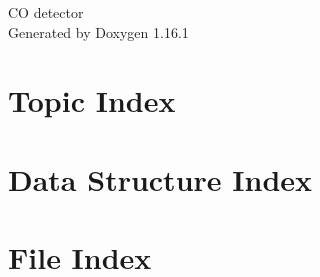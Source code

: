 \documentclass[twoside]{book}
\newcommand{\+}{\discretionary{\mbox{\scriptsize$\hookleftarrow$}}{}{}}
\newcommand{\clearemptydoublepage}{%
    \newpage{\pagestyle{empty}\cleardoublepage}%
  }
\begin{document}
  \raggedbottom
    \hypersetup{pageanchor=false,
                bookmarksnumbered=true,
                pdfencoding=unicode
               }
  \begin{titlepage}
  \vspace*{7cm}
  \begin{center}%
  {\Large CO detector}\\
  \vspace*{1cm}
  {\large Generated by Doxygen 1.16.1}\\
  \end{center}
  \end{titlepage}
  \clearemptydoublepage
  \tableofcontents
  \clearemptydoublepage
  \hypersetup{pageanchor=true}



\chapter{Topic Index}

\chapter{Data Structure Index}

\chapter{File Index}

\end{document}
